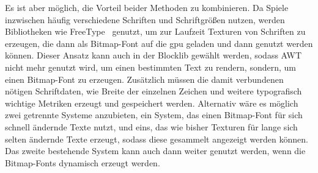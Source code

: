 Es ist aber möglich, die Vorteil beider Methoden zu kombinieren. Da Spiele inzwischen häufig verschiedene Schriften und Schriftgrößen nutzen, werden Bibliotheken wie FreeType~\cite{TheFreeTypeProject,Vries2020} genutzt, um zur Laufzeit Texturen von Schriften zu erzeugen, die dann als Bitmap-Font auf die \ac{gpu} geladen und dann genutzt werden können. Dieser Ansatz kann auch in der Blocklib gewählt werden, sodass AWT nicht mehr genutzt wird, um einen bestimmten Text zu rendern, sondern, um einen Bitmap-Font zu erzeugen. Zusätzlich müssen die damit verbundenen nötigen Schriftdaten, wie Breite der einzelnen Zeichen und weitere typografisch wichtige Metriken erzeugt und gespeichert werden. Alternativ wäre es möglich zwei getrennte Systeme anzubieten, ein System, das einen Bitmap-Font für sich schnell ändernde Texte nutzt, und eins, das wie bisher Texturen für lange sich selten ändernde Texte erzeugt, sodass diese gesammelt angezeigt werden können. Das zweite bestehende System kann auch dann weiter genutzt werden, wenn die Bitmap-Fonts dynamisch erzeugt werden.
